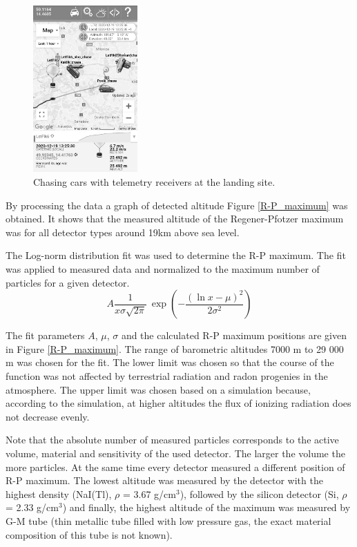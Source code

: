 \documentclass{Rpd}
\begin{document}
\begin{figure}%
	\centerline{\includegraphics[width=40mm]{img/FIK-6_rescue_team.png}}
	\caption{Chasing cars with telemetry receivers at the landing site. \label{FIK-6_rescue_team}}
\end{figure}

By processing the data a graph of detected altitude Figure \ref{R-P_maximum} was obtained. It shows that the measured altitude of the Regener-Pfotzer maximum was for all detector types around 19km above sea level.

The Log-norm distribution fit was used to determine the R-P maximum. The fit was applied to measured data and normalized to the maximum number of particles for a given detector.
\begin{equation}A \frac 1 {x\sigma\sqrt{2\pi}}\ \exp\left( - \frac{\left(\ln x-\mu\right)^2}{2\sigma^2}\right)\end{equation}

The fit parameters $A$, $\mu$, $\sigma$ and the calculated R-P maximum positions are given in Figure \ref{R-P_maximum}. The range of barometric altitudes 7000 m to 29 000 m was chosen for the fit. The lower limit was chosen so that the course of the function was not affected by terrestrial radiation and radon progenies in the atmosphere. The upper limit was chosen based on a simulation because, according to the simulation, at higher altitudes the flux of ionizing radiation does not decrease evenly. 

Note that the absolute number of measured particles corresponds to the active volume, material and sensitivity of the used detector. The larger the volume the more particles. At the same time every detector measured a different position of R-P maximum. The lowest altitude was measured by the detector with the highest density (NaI(Tl), $\rho$ = 3.67 g/cm$^3$), followed by the silicon detector (Si, $\rho$ = 2.33 g/cm$^3$) and finally, the highest altitude of the maximum was measured by G-M tube (thin metallic tube filled with low pressure gas, the exact material composition of this tube is not known).
\end{document}
